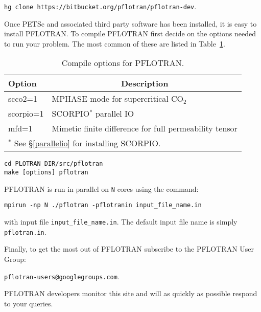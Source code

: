 \begin{description}
{\footnotesize\tt hg clone https://bitbucket.org/pflotran/pflotran-dev}.

\item[Step 3: Compiling PFLOTRAN] Once PETSc and associated third party software has been installed, it is easy to install PFLOTRAN. To compile PFLOTRAN first decide on the options needed to run your problem. The most common of these are listed in Table~\ref{topt}.

\begin{table}[H]\centering
\caption{Compile options for PFLOTRAN.}

\vspace{3mm}

\label{topt}
\begin{tabular}{ll}
\toprule
Option & \multicolumn{1}{c}{Description}\\
\midrule
scco2=1 & MPHASE mode for supercritical CO$_2$\\
scorpio=1 & SCORPIO$^{*}$ parallel IO\\
mfd=1 & Mimetic finite difference for full permeability tensor\\
\bottomrule
\multicolumn{2}{l}{$^{*}$ See \S\ref{parallelio} for installing SCORPIO.}
\end{tabular}

\end{table}

\begin{Verbatim}
cd PLOTRAN_DIR/src/pflotran
make [options] pflotran
\end{Verbatim}

\item[Step 4: Running PFLOTRAN] PFLOTRAN is run in parallel on {\tt N} cores using the command:

{\footnotesize\tt mpirun -np N ./pflotran -pflotranin input\_file\_name.in}

with input file {\footnotesize\tt input\_file\_name.in}. The default input file name is simply {\footnotesize\tt pflotran.in}.
\end{description}

\noindent
Finally, to get the most out of PFLOTRAN subscribe to the PFLOTRAN User Group:

{\footnotesize\tt pflotran-users@googlegroups.com}.

\noindent
PFLOTRAN developers monitor this site and will as quickly as possible respond to your queries.
